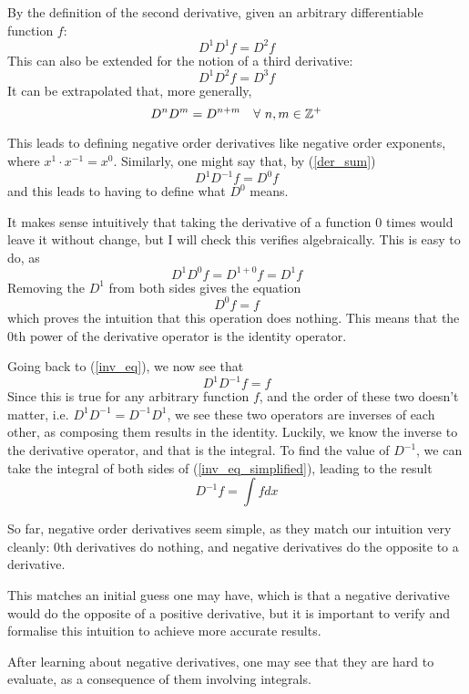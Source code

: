 \documentclass{article}
\def\squad{\hskip2\fontdimen3\font}
\begin{document}
By the definition of the second derivative, given an arbitrary differentiable
function $f$: $$D^1D^1 f = D^2 f$$ This can also be extended for the notion of
a third derivative: $$D^1D^2 f = D^3 f$$ It can be extrapolated that, more
generally,
\begin{equation}
	\label{der_sum}
	D^nD^m = D^{n+m} \quad \forall \squad n,m \in \mathbb{Z}^{+}
\end{equation}

This leads to defining negative order derivatives like negative order
exponents, where $x^1 \cdot x^{-1}= x^0$. Similarly, one might say that, by (\ref{der_sum})
\begin{equation}
	\label{inv_eq}
	D^1D^{-1} f = D^0 f
\end{equation}
and this leads to having to define what $D^0$ means.

It makes sense intuitively that taking the derivative of a function 0 times
would leave it without change, but I will check this verifies
algebraically. This is easy to do, as $$D^1 D^0 f = D^{1+0} f = D^1 f$$
Removing the $D^1$ from both sides gives the equation $$D^0 f = f$$ which
proves the intuition that this operation does nothing. This means that the 0th
power of the derivative operator is the identity operator.

Going back to (\ref{inv_eq}), we now see that
\begin{equation}
	\label{inv_eq_simplified}
	D^1D^{-1} f = f
\end{equation}
Since this is true for any arbitrary function $f$, and the order of these two
doesn't matter, i.e. $D^1D^{-1}=D^{-1}D^1$, we see these two operators are
inverses of each other, as composing them results in the identity. Luckily, we
know the inverse to the derivative operator, and that is the integral. To find
the value of $D^{-1}$, we can take the integral of both sides of
(\ref{inv_eq_simplified}), leading to the result
$$
D^{-1} f = \int f dx
$$

So far, negative order derivatives seem simple, as they match our intuition very cleanly:
0th derivatives do nothing, and negative derivatives do the opposite to a derivative.

This matches an initial guess one may have, which is that a negative derivative
would do the opposite of a positive derivative, but it is important to verify
and formalise this intuition to achieve more accurate results.

After learning about negative derivatives, one may see that they are hard to
evaluate, as a consequence of them involving integrals.
\end{document}
